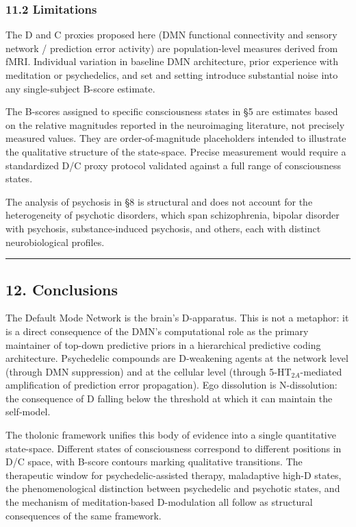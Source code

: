 \documentclass[
  11pt,
  letterpaper,
]{article}
\begin{document}
\subsubsection{11.2 Limitations}\label{limitations}

The D and C proxies proposed here (DMN functional connectivity and
sensory network / prediction error activity) are population-level
measures derived from fMRI. Individual variation in baseline DMN
architecture, prior experience with meditation or psychedelics, and set
and setting introduce substantial noise into any single-subject B-score
estimate.

The B-scores assigned to specific consciousness states in §5 are
estimates based on the relative magnitudes reported in the neuroimaging
literature, not precisely measured values. They are order-of-magnitude
placeholders intended to illustrate the qualitative structure of the
state-space. Precise measurement would require a standardized D/C proxy
protocol validated against a full range of consciousness states.

The analysis of psychosis in §8 is structural and does not account for
the heterogeneity of psychotic disorders, which span schizophrenia,
bipolar disorder with psychosis, substance-induced psychosis, and
others, each with distinct neurobiological profiles.

\begin{center}\rule{0.5\linewidth}{0.5pt}\end{center}

\subsection{12. Conclusions}\label{conclusions}

The Default Mode Network is the brain's D-apparatus. This is not a
metaphor: it is a direct consequence of the DMN's computational role as
the primary maintainer of top-down predictive priors in a hierarchical
predictive coding architecture. Psychedelic compounds are D-weakening
agents at the network level (through DMN suppression) and at the
cellular level (through 5-HT\(_{2A}\)-mediated amplification of
prediction error propagation). Ego dissolution is N-dissolution: the
consequence of D falling below the threshold at which it can maintain
the self-model.

The tholonic framework unifies this body of evidence into a single
quantitative state-space. Different states of consciousness correspond
to different positions in D/C space, with B-score contours marking
qualitative transitions. The therapeutic window for psychedelic-assisted
therapy, maladaptive high-D states, the phenomenological distinction
between psychedelic and psychotic states, and the mechanism of
meditation-based D-modulation all follow as structural consequences of
the same framework.
\end{document}
